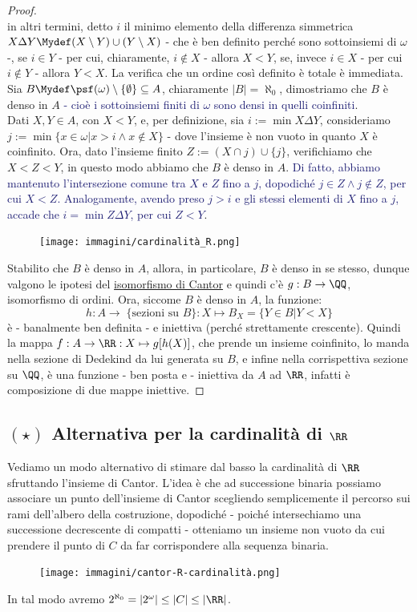 \begin{proof}
\[		\]
	in altri termini, detto $i$ il minimo elemento della differenza simmetrica $X \Delta Y \Mydef (X \setminus Y) \cup (Y \setminus X)$ - che è ben definito perché sono sottoinsiemi di $\omega$ -, se $i \in Y$ - per cui, chiaramente, $i \not \in X$ - allora $X < Y$, se, invece $i \in X$ - per cui $i \not \in Y$ - allora $Y < X$.
	La verifica che un ordine così definito è totale è immediata.\\
	Sia $B \Mydef \psf(\omega) \setminus \{\emptyset\} \subseteq A$, chiaramente $|B| = \aleph_0$, dimostriamo che $B$ è denso in $A$ \textcolor{MidnightBlue}{- cioè i sottoinsiemi finiti di $\omega$ sono densi in quelli coinfiniti}.\\
	Dati $X,Y \in A$, con $X < Y$, e, per definizione, sia $i := \min X \Delta Y$, consideriamo $j := \min \{x \in \omega | x > i \land x \not \in X\}$ - dove l'insieme è non vuoto in quanto $X$ è coinfinito. 
	Ora, dato l'insieme finito $Z := (X \cap j) \cup \{j\}$, verifichiamo che $X < Z < Y$, in questo modo abbiamo che $B$ è denso in $A$.
 	\textcolor{MidnightBlue}{Di fatto, abbiamo mantenuto l'intersezione comune tra $X$ e $Z$ fino a $j$, dopodiché $j \in Z \land j \not \in Z$, per cui $X < Z$. Analogamente, avendo preso $j > i$ e gli stessi elementi di $X$ fino a $j$, accade che $i = \min Z \Delta Y$, per cui $Z < Y$}.
	\begin{figure}[H]
		\centering
		\texttt{[image: immagini/cardinalità\_R.png]}
	\end{figure}
	Stabilito che $B$ è denso in $A$,  allora, in particolare, $B$ è denso in se stesso, dunque
 	valgono le ipotesi del \hyperref[isoCantor]{isomorfismo di Cantor} e quindi c'è $g : B \rightarrow \QQ$, isomorfismo di ordini.
	Ora, siccome $B$ è denso in $A$, la funzione:
	\[ h : A \rightarrow \; \{\text{sezioni su $B$}\} : X \mapsto B_X = \{Y \in B | Y < X\}
		\]
	è - banalmente ben definita - e iniettiva (perché strettamente crescente). Quindi la mappa $f : A \rightarrow \RR : X \mapsto g[h(X)]$, che prende un insieme coinfinito, lo manda nella sezione di Dedekind da lui generata su $B$,
	e infine nella corrispettiva sezione su $\QQ$, è una funzione - ben posta e - iniettiva da $A$ ad $\RR$, infatti è composizione di due mappe iniettive.
\end{proof}

\subsection{\texorpdfstring{$(\star)$ Alternativa per la cardinalità di $\RR$}{Alternativa per la cardinalità dei reali}}
Vediamo un modo alternativo di stimare dal basso la cardinalità di $\RR$ sfruttando l'insieme di Cantor.
L'idea è che ad successione binaria possiamo associare un punto dell'insieme di Cantor scegliendo semplicemente il percorso sui rami dell'albero della costruzione,
dopodiché - poiché intersechiamo una successione decrescente di compatti - otteniamo un insieme non vuoto da cui prendere il punto di $C$ da far corrispondere alla sequenza binaria.
\begin{figure}[H]
	\centering
	\texttt{[image: immagini/cantor-R-cardinalità.png]}
\end{figure}
In tal modo avremo $2^{\aleph_0} = |2^{\omega}| \leq |C| \leq |\RR|$.

